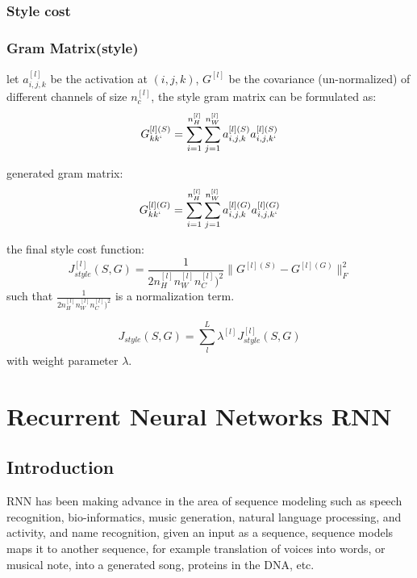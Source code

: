 \documentclass[4apaper,12pt]{book}
\begin{document}
\begin{description}
\begin{description}
        \subsection{Style cost}
        \begin{description}
          \subsection{Gram Matrix(style)}
          \item let $a_{i,j,k}^{[l]}$ be the  activation  at $(i,j,k)$, $G^{[l]}$  be the covariance (un-normalized) of different channels of size $n_c^{[l]}$, the style gram matrix can be formulated as: $$
            G_{kk`}^{[l](S)} = \sum_{i=1}^{n_H^{[l]}} \sum_{j=1}^{n_W^{[l]}} a_{i,j,k}^{[l](S)} a_{i,j,k`}^{[l](S)}$$
          \item generated gram matrix: $$
            G_{kk`}^{[l](G)} = \sum_{i=1}^{n_H^{[l]}} \sum_{j=1}^{n_W^{[l]}} a_{i,j,k}^{[l](G)} a_{i,j,k`}^{[l](G)} $$
        \item the final style cost function: $$
          J_{style}^{[l]}(S,G) = \frac{1}{2n_H^{[l]}n_W^{[l]}n_C^{[l]})^2} \| G^{[l](S)} - G^{[l](G)}\|_F^2
          $$ such that $\frac{1}{2n_H^{[l]}n_W^{[l]}n_C^{[l]})^2}$ is a normalization term.
          \item $$J_{style}(S,G) = \sum_l^L \lambda^{[l]} J_{style}^{[l]}(S,G) $$ with weight parameter $\lambda$.
        \end{description}

    \end{description}
  \end{description}

  \chapter{Recurrent Neural Networks RNN}
  \section{Introduction}
  \begin{description}
  \item RNN has been making advance in the area of sequence modeling such as speech recognition, bio-informatics, music generation, natural language processing, and activity, and name recognition, given an input as a sequence, sequence models maps it to another sequence, for example translation of voices into words, or musical note, into a generated song, proteins in the DNA, etc.
  \end{description}
\end{document}
